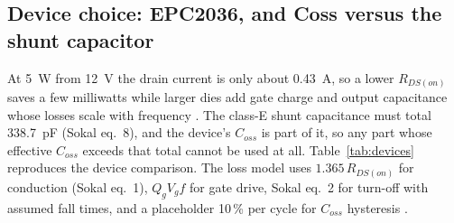 \documentclass[11pt,letterpaper]{article}
\begin{document}
\subsection{Device choice: EPC2036, and Coss versus the shunt capacitor}\label{sec:device}

At \SI{5}{\watt} from \SI{12}{\volt} the drain current is only about \SI{0.43}{\ampere}, so a lower $R_{DS(on)}$ saves a few milliwatts while larger dies add gate charge and output capacitance whose losses scale with frequency \cite{projnotes}. The class-E shunt capacitance must total \SI{338.7}{\pico\farad} (Sokal eq.~8), and the device's $C_{oss}$ is part of it, so any part whose effective $C_{oss}$ exceeds that total cannot be used at all. Table~\ref{tab:devices} reproduces the device comparison. The loss model uses $1.365\,R_{DS(on)}$ for conduction (Sokal eq.~1), $Q_g V_g f$ for gate drive, Sokal eq.~2 for turn-off with assumed fall times, and a placeholder 10\,\% per cycle for $C_{oss}$ hysteresis \cite{sokal2001,projnotes}.
\end{document}
